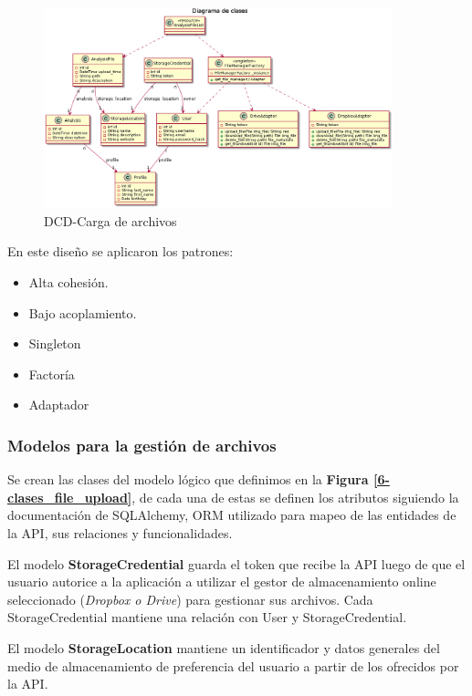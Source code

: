 	\begin{figure}[h]
        \centering
        \includegraphics[width=0.9\textwidth]{img/dcd_file_upload}
        \caption{DCD-Carga de archivos}
		\label{6-dcd_file_upload}
    \end{figure}
   
\newpage

	En este diseño se aplicaron los patrones:
		\begin{itemize}			
			\item Alta cohesión.
			\item Bajo acoplamiento.
			\item Singleton
			\item Factoría
			\item Adaptador
		\end{itemize}

\subsubsection{Modelos para la gestión de archivos}

Se crean las clases del modelo lógico que definimos en la \textbf{Figura \ref{6-clases_file_upload}}, de cada una de estas se definen los atributos siguiendo la documentación de SQLAlchemy, ORM utilizado para mapeo de las entidades de la API, sus relaciones y funcionalidades. 

El modelo \textbf{StorageCredential} guarda el token que recibe la API luego de que el usuario autorice a la aplicación a utilizar el gestor de almacenamiento online seleccionado (\textit{Dropbox o Drive}) para gestionar sus archivos. Cada StorageCredential mantiene una relación con User y StorageCredential.

El modelo \textbf{StorageLocation} mantiene un identificador y datos generales del medio de almacenamiento de preferencia del usuario a partir de los ofrecidos por la API.

